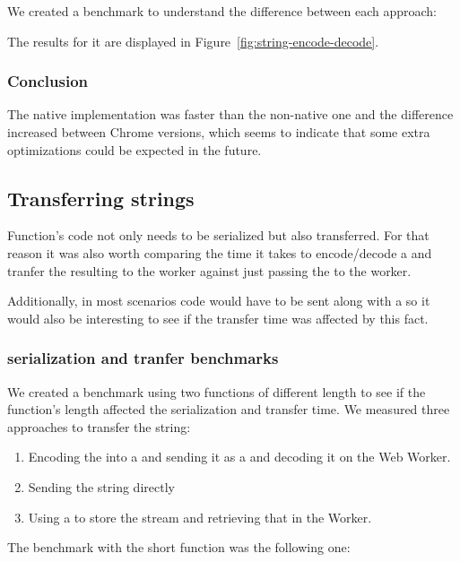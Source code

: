 We created a benchmark to understand the difference between each approach:

The results for it are displayed in Figure~\ref{fig:string-encode-decode}.

\subsubsection{Conclusion}
The native implementation was faster than the non-native one and the difference increased between Chrome versions, which seems to indicate that some extra optimizations could be expected in the future.

\subsection{Transferring strings}
Function's code not only needs to be serialized but also transferred. For that reason it was also worth comparing the time it takes to encode/decode a \tstring{} and tranfer the resulting \tabuffer{} to the worker against just passing the \tstring{} to the worker.

Additionally, in most scenarios code would have to be sent along with a \ttarray{} so it would also be interesting to see if the transfer time was affected by this fact.

\subsubsection{\tstring{} serialization and tranfer benchmarks}
We created a benchmark using two functions of different length to see if the function's length affected the serialization and transfer time. We measured three approaches to transfer the string:
\begin{enumerate}
  \item Encoding the \tstring{} into a \tabuffer{} and sending it as a  and decoding it on the Web Worker.
  \item Sending the string directly
  \item Using a  to store the stream and retrieving that in the Worker.
\end{enumerate}

The benchmark with the short function was the following one:

